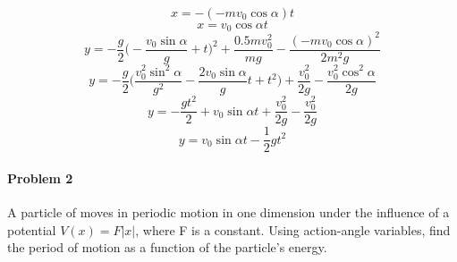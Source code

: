 \documentclass[11pt,a4paper]{report}
\begin{document}
\begin{equation}
x = -(-mv_0\cos\alpha)t
\end{equation}
\begin{equation}
\boxed{x = v_0\cos\alpha t}
\end{equation}
\begin{equation}
y = -\dfrac{g}{2}\Big(-\dfrac{v_0\sin\alpha}{g}+t\Big)^2+\dfrac{0.5mv_0^2}{mg}-\dfrac{(-mv_0\cos\alpha)^2}{2m^2g}
\end{equation}
\begin{equation}
y = -\dfrac{g}{2}\Big(\dfrac{v_0^2\sin^2\alpha}{g^2}-\dfrac{2v_0\sin\alpha}{g}t+t^2\Big)+\dfrac{v_0^2}{2g}-\dfrac{v_0^2\cos^2\alpha}{2g}
\end{equation}
\begin{equation}
y = -\dfrac{gt^2}{2}+v_0\sin\alpha t+\dfrac{v_0^2}{2g}-\dfrac{v_0^2}{2g}
\end{equation}
\begin{equation}
\boxed{y = v_0\sin\alpha t - \dfrac{1}{2}gt^2}
\end{equation}


\vspace{5mm}
\paragraph{Problem 2} A particle of moves in periodic motion in one dimension under the influence of a potential $V(x) = F|x|$, where F is a constant. Using action-angle variables, find the period of motion as a function of the particle's energy. 
\end{document}
